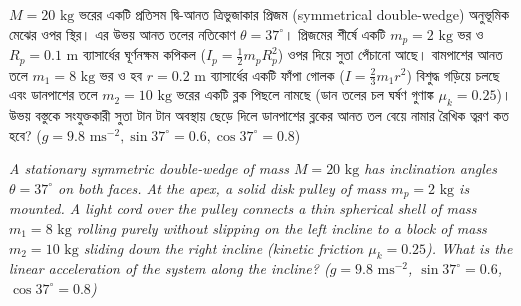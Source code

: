 \documentclass[12pt, a4paper]{article}
\begin{document}
\begin{tcolorbox}[questionbox={প্রশ্ন (Question) 5}]
    \noindent
    $M = 20\text{ kg}$ ভরের একটি প্রতিসম দ্বি-আনত ত্রিভুজাকার প্রিজম (symmetrical double-wedge) অনুভূমিক মেঝের ওপর স্থির। এর উভয় আনত তলের নতিকোণ $\theta = 37^\circ$। প্রিজমের শীর্ষে একটি $m_p = 2\text{ kg}$ ভর ও $R_p = 0.1\text{ m}$ ব্যাসার্ধের ঘূর্ণনক্ষম কপিকল ($I_p = \frac{1}{2} m_p R_p^2$) ওপর দিয়ে সুতা পেঁচানো আছে। বামপাশের আনত তলে $m_1 = 8\text{ kg}$ ভর ও হব $r = 0.2\text{ m}$ ব্যাসার্ধের একটি ফাঁপা গোলক ($I = \frac{2}{3} m_1 r^2$) বিশুদ্ধ গড়িয়ে চলছে এবং ডানপাশের তলে $m_2 = 10\text{ kg}$ ভরের একটি ব্লক পিছলে নামছে (ডান তলের চল ঘর্ষণ গুণাঙ্ক $\mu_k = 0.25$)। উভয় বস্তুকে সংযুক্তকারী সুতা টান টান অবস্থায় ছেড়ে দিলে ডানপাশের ব্লকের আনত তল বেয়ে নামার রৈখিক ত্বরণ কত হবে? ($g = 9.8\text{ ms}^{-2}, \sin 37^\circ = 0.6, \cos 37^\circ = 0.8$)
    
    \vspace{0.8em}
    \begin{english}
    \noindent\textit{\color{darkgray}
    A stationary symmetric double-wedge of mass $M = 20\text{ kg}$ has inclination angles $\theta = 37^\circ$ on both faces. At the apex, a solid disk pulley of mass $m_p = 2\text{ kg}$ is mounted. A light cord over the pulley connects a thin spherical shell of mass $m_1 = 8\text{ kg}$ rolling purely without slipping on the left incline to a block of mass $m_2 = 10\text{ kg}$ sliding down the right incline (kinetic friction $\mu_k = 0.25$). What is the linear acceleration of the system along the incline? ($g = 9.8\text{ ms}^{-2}$, $\sin 37^\circ = 0.6$, $\cos 37^\circ = 0.8$)
    }
    \end{english}
\end{tcolorbox}
\end{document}
